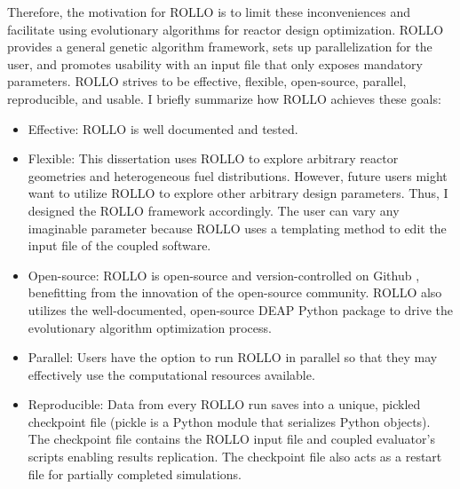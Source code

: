 Therefore, the motivation for \gls{ROLLO} is to limit these inconveniences and 
facilitate using evolutionary algorithms for reactor design optimization.
\gls{ROLLO} provides a general genetic algorithm framework, sets up 
parallelization for the user, and promotes usability with an input file 
that only exposes mandatory parameters.
\gls{ROLLO} strives to be effective, flexible, open-source, parallel, reproducible, 
and usable. 
I briefly summarize how \gls{ROLLO} achieves these goals:
\begin{itemize}
    \item Effective: \gls{ROLLO} is well documented and tested.
    \item Flexible: This dissertation uses \gls{ROLLO} to 
    explore arbitrary reactor geometries and heterogeneous fuel distributions. 
    However, future users might want to utilize \gls{ROLLO} 
    to explore other arbitrary design parameters. Thus, I designed the \gls{ROLLO}
    framework accordingly. The user can vary any imaginable parameter 
    because \gls{ROLLO} uses a templating method to edit the input file of the 
    coupled software.
    \item Open-source: \gls{ROLLO} is open-source and version-controlled on Github 
    \cite{chee_rollo_2021}, benefitting from the innovation of the open-source 
    community. \gls{ROLLO} also utilizes the well-documented, open-source 
    \gls{DEAP} \cite{fortin_deap_2012} Python package to drive the evolutionary 
    algorithm optimization process.
    \item Parallel: Users have the option to run \gls{ROLLO} in parallel so that 
    they may effectively use the computational resources available. 
    \item Reproducible: Data from every \gls{ROLLO} run saves into a unique, pickled 
    checkpoint file (pickle is a Python module that serializes Python objects). 
    The checkpoint file contains the \gls{ROLLO} input file and coupled evaluator's 
    scripts enabling results replication. The checkpoint file also acts as a restart 
    file for partially completed simulations. 
\end{itemize}


